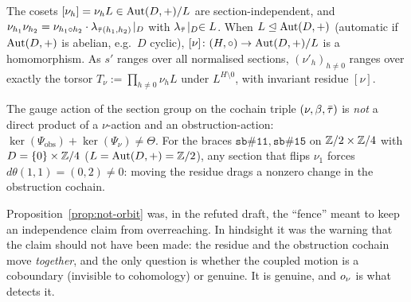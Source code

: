 \begin{lemma}\label{lem:res-inv}
The cosets $[\nu_h]=\nu_h L\in\mathrm{Aut}(D,+)/L$ are section-independent, and
$\nu_{h_1}\nu_{h_2}=\nu_{h_1\circ h_2}\cdot\lambda_{\bar\tau(h_1,h_2)}\!\mid_D$ with
$\lambda_{\bar\tau}\!\mid_D\in L$. When $L\trianglelefteq\mathrm{Aut}(D,+)$ (automatic if
$\mathrm{Aut}(D,+)$ is abelian, e.g.\ $D$ cyclic), $[\nu]\colon(H,\circ)\to\mathrm{Aut}(D,+)/L$ is a
homomorphism. As $s'$ ranges over all normalised sections, $(\nu'_h)_{h\neq0}$
ranges over exactly the torsor $T_\nu:=\prod_{h\neq0}\nu_h L$ under
$L^{H\setminus0}$, with invariant residue $[\nu]$.
\end{lemma}

\begin{proposition}
\label{prop:not-orbit}
The gauge action of the section group on the cochain triple
$(\nu,\beta,\bar\tau)$ is \emph{not} a direct product of a $\nu$-action and an
obstruction-action: $\ker(\Psi_{\mathrm{obs}})+\ker(\Psi_\nu)\neq\Theta$. For the
braces $\mathtt{sb\#11},\mathtt{sb\#15}$ on $\mathbb{Z}/2\times\mathbb{Z}/4$ with $D=\{0\}\times\mathbb{Z}/4$
($L=\mathrm{Aut}(D,+)=\mathbb{Z}/2$), any section that flips $\nu_1$ forces
$d\theta(1,1)=(0,2)\neq0$: moving the residue drags a nonzero change in the
obstruction cochain.
\end{proposition}

Proposition~\ref{prop:not-orbit} was, in the refuted draft, the ``fence'' meant to
keep an independence claim from overreaching. In hindsight it was the warning that
the claim should not have been made: the residue and the obstruction cochain move
\emph{together}, and the only question is whether the coupled motion is a
coboundary (invisible to cohomology) or genuine. It is genuine, and $o_\nu$ is what
detects it.


